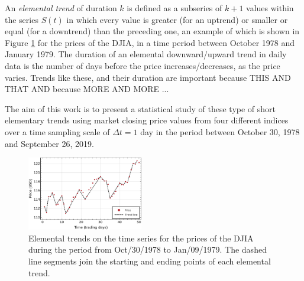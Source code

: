 \documentclass[a4paper]{jpconf}
\begin{document}
An \emph{elemental trend} of duration $k$ is defined as a subseries of $k+1$ values within the series $S(t)$ in which every value is greater (for an uptrend) or smaller or equal (for a downtrend) than the preceding one, an example of which is shown in Figure \ref{fig:trends} for the prices of the DJIA, in a time period between October 1978 and January 1979. The duration of an elemental downward/upward trend in daily data is the number of days before the price increases/decreases, as the price varies. Trends like these, and their duration are important because THIS AND THAT AND because MORE AND MORE ...

The aim of this work is to present a statistical study of these type of short elementary trends using market closing price values from four different indices over a time sampling scale of $\Delta t=1$ day in the period between October 30, 1978 and September 26, 2019.

\begin{figure}
\begin{center}
\includegraphics[width=0.45\textwidth]{img/TrendReturnsVisual.pdf}
\end{center}
\caption{\small \label{fig:trends}Elemental trends on the time series for the prices of the DJIA during the period from Oct/30/1978 to Jan/09/1979. The dashed line segments join the starting and ending points of each elemental trend.}
\end{figure}
\end{document}
